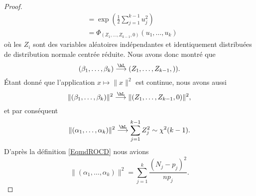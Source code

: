 \begin{proof}
\begin{subequations}
\begin{align}
            &=\exp\left( \frac{ 1 }{2}\sum_{j=1}^{k-1}u_j^2 \right)\\
            &=\Phi_{(Z_1,\ldots, Z_{k-1},0)}(u_1,\ldots, u_k)
        \end{align}
    \end{subequations}
    où les \( Z_i\) sont des variables aléatoires indépendantes et identiquement distribuées de distribution normale centrée réduite. Nous avons donc montré que
    \begin{equation}
        (\beta_1,\ldots, \beta_k)\stackrel{\hL}{\longrightarrow}(Z_1,\ldots, Z_{k-1},)).
    \end{equation}
    Étant donné que l'application \( x\mapsto \| x \|^2\) est continue, nous avons aussi
    \begin{equation}
        \| (\beta_1,\ldots, \beta_k) \|^2\stackrel{\hL}{\longrightarrow}\| (Z_1,\ldots, Z_{k-1},0) \|^2,
    \end{equation}
    et par conséquent
    \begin{equation}
        \| (\alpha_1,\ldots, \alpha_k) \|^2\stackrel{\hL}{\longrightarrow}\sum_{j=1}^{k-1}Z_j^2\sim\chi^2(k-1).
    \end{equation}
    D'après la définition \eqref{EqmdROCD} nous avions
    \begin{equation}
        \| (\alpha_1,\ldots, \alpha_k) \|^2=\sum_{j=1}^k\frac{ (N_j-p_j)^2 }{ np_j }.
    \end{equation}
\end{proof}
